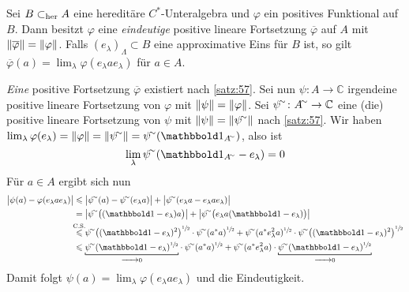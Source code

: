 \begin{satz}[{name=[Eindeutigkeit der Fortsetzung im hereditären Fall]}]
	Sei $B \subher A$ eine hereditäre $C^*$-Unteralgebra und $\varphi$ ein positives Funktional auf $B$. 
	Dann besitzt $\varphi$ eine \emph{eindeutige} positive lineare Fortsetzung $\overline{\varphi}$ auf $A$ mit $\norm*{\overline{\varphi}}=\norm*{\varphi}$.
	Falls $(e_\lambda)_\Lambda \subset B$ eine approximative Eins für $B$ ist, so gilt $\overline{\varphi}(a) = \lim_\lambda \varphi(e_\lambda a e_\lambda)$ für $a \in A$.
\end{satz}
\begin{beweis}
	\emph{Eine} positive Fortsetzung $\overline{\varphi}$ existiert nach \autoref{satz:57}. 
	Sei nun $\psi \colon A \to \mathbb{C}$ irgendeine positive lineare Fortsetzung von $\varphi$ mit $\norm*{\psi}=\norm*{\varphi}$.
	Sei $\psi^\simm \colon A^\simm \to \mathbb{C}$ eine (die) positive lineare Fortsetzung von $\psi$ mit $\norm*{\psi}=\norm*{\psi^\simm}$ nach \autoref{satz:57}.
	Wir haben $\lim_\lambda \varphi(e_\lambda)=\norm*{\varphi} = \norm*{\psi^\simm} = \psi^\simm(\ind_{A^\simm})$, also ist 
	\[
		\lim_\lambda \psi^\simm(\ind_{A^\simm} -e_\lambda)=0
	\]
	Für  $a \in A$ ergibt sich nun
	\begin{align}
		\abs[\big]{\psi(a)- \varphi(e_\lambda a e_\lambda)} &\le \abs[\big]{\psi^\simm(a)- \psi^\simm(e_\lambda a)} + \abs[\big]{ \psi^\simm \enbrace*{e_\lambda a - e_\lambda a e_\lambda}}\\
		&= \abs[\big]{\psi^\simm \enbrace[\big]{(\ind -e_\lambda)a}} + \abs[\big]{\psi^\simm \enbrace[\big]{e_\lambda a(\ind -e_\lambda)}} \\ 
		&\StackTextClap{C.S.}{\le} \psi^\simm \enbrace*{(\ind-e_\lambda)^2}^{\sfrac{1}{2}} \cdot \psi^\simm \enbrace*{a^*a}^{\sfrac{1}{2}} + \psi^\simm(a^* e_\lambda^2 a)^{\sfrac{1}{2}} \cdot \psi^\simm \enbrace*{(\ind-e_\lambda)^2}^{\sfrac{1}{2}} \\
		&\le \Underbracket{\psi^\simm (\ind-e_\lambda)^{\sfrac{1}{2}}}{\grenzw{} 0}\cdot  \psi^\simm (a^*a)^{\sfrac{1}{2}} + \psi^\simm (a^*e_\lambda^2 a) \cdot  \Underbracket{\psi^\simm(\ind-e_\lambda)^{\sfrac{1}{2}}}{\grenzw{} 0}
	\end{align}
	Damit folgt $\psi(a) = \lim_\lambda \varphi(e_\lambda a e_\lambda)$ und die Eindeutigkeit.
\end{beweis}

